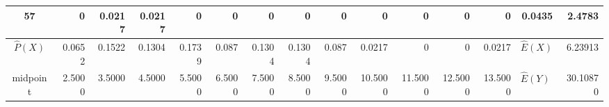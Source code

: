 \begin{table}[hb!]
\begin{adjustbox}{width = \textwidth, center}
\begin{tabular}{|c|r|r|r|r|r|r|r|r|r|r|r|r|r|r|}
        \rowcolor[HTML]{FFFFFF} 
        \cellcolor[HTML]{CFE2F3}57                                  & 0                                              & \cellcolor[HTML]{C7E9D8}0.0217                 & \cellcolor[HTML]{C7E9D8}0.0217                 & 0                                              & 0                                              & 0                                              & 0                                              & 0                                               & 0                                               & 0                                               & 0                                               & 0                                               & \cellcolor[HTML]{D9D2E9}0.0435                                                  & \cellcolor[HTML]{D9D2E9}2.4783                                                        \\ \hline
        \rowcolor[HTML]{D9EAD3} 
        $\widehat{P}(X)$                                            & 0.0652                                         & 0.1522                                         & 0.1304                                         & 0.1739                                         & 0.087                                          & 0.1304                                         & 0.1304                                         & 0.087                                           & 0.0217                                          & 0                                               & 0                                               & 0.0217                                          & \multicolumn{1}{l|}{\cellcolor[HTML]{FCE5CD}$\widehat{E}(X)$}                   & \cellcolor[HTML]{FCE5CD}6.23913                                                       \\ \hline
        \rowcolor[HTML]{D9EAD3} 
        midpoint                                                    & 2.5000                                         & 3.5000                                         & 4.5000                                         & 5.5000                                         & 6.5000                                         & 7.5000                                         & 8.5000                                         & 9.5000                                          & 10.5000                                         & 11.5000                                         & 12.5000                                         & 13.5000                                         & \multicolumn{1}{l|}{\cellcolor[HTML]{FCE5CD}$\widehat{E}(Y)$}                   & \cellcolor[HTML]{FCE5CD}30.10870                                                      \\ \hline

\end{tabular}
\end{adjustbox}
\end{table}
